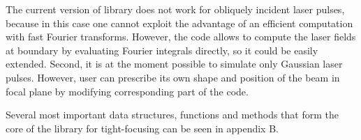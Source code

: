 The current version of library does not work for obliquely incident laser pulses, because in this case one cannot exploit the advantage of an efficient computation with fast Fourier transforms. However, the code allows to compute the laser fields at boundary by evaluating Fourier integrals directly, so it could be easily extended. Second, it is at the moment possible to simulate only Gaussian laser pulses. However, user can prescribe its own shape and position of the beam in focal plane by modifying corresponding part of the code.

Several most important data structures, functions and methods that form the core of the library for tight-focusing can be seen in appendix B.